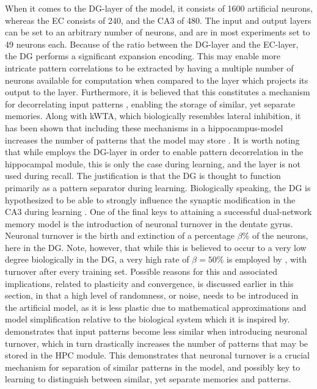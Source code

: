 When it comes to the DG-layer of the model, it consists of 1600 artificial neurons, whereas the EC consists of 240, and the CA3 of 480. The input and output layers can be set to an arbitrary number of neurons, and are in most experiments set to 49 neurons each. Because of the ratio between the DG-layer and the EC-layer, the DG performs a significant expansion encoding. This may enable more intricate pattern correlations to be extracted by having a multiple number of neurons available for computation when compared to the layer which projects its output to the layer. Furthermore, it is believed that this constitutes a mechanism for decorrelating input patterns \citep{Rolls1998chpt2}, enabling the storage of similar, yet separate memories. Along with kWTA, which biologically resembles lateral inhibition, it has been shown that including these mechanisms in a hippocampus-model increases the number of patterns that the model may store \citep{Wakagi2008, Hattori2014}. It is worth noting that while \cite{Hattori2014} employs the DG-layer in order to enable pattern decorrelation in the hippocampal module, this is only the case during learning, and the layer is not used during recall. The justification is that the DG is thought to function primarily as a pattern separator during learning. Biologically speaking, the DG is hypothesized to be able to strongly influence the synaptic modification in the CA3 during learning \citep{Rolls1998chpt6}.
One of the final keys to attaining a successful dual-network memory model is the introduction of neuronal turnover in the dentate gyrus. Neuronal turnover is the birth and extinction of a percentage $\beta \%$ of the neurons, here in the DG. Note, however, that while this is believed to occur to a very low degree biologically in the DG, a very high rate of $\beta = 50 \%$ is employed by \cite{Hattori2014}, with turnover after every training set. Possible reasons for this and associated implications, related to plasticity and convergence, is discussed earlier in this section, in that a high level of randomness, or noise, needs to be introduced in the artificial model, as it is less plastic due to mathematical approximations and model simplification relative to the biological system which it is inspired by. \cite{Hattori2014} demonstrates that input patterns become less similar when introducing neuronal turnover, which in turn drastically increases the number of patterns that may be stored in the HPC module. This demonstrates that neuronal turnover is a crucial mechanism for separation of similar patterns in the model, and possibly key to learning to distinguish between similar, yet separate memories and patterns.

